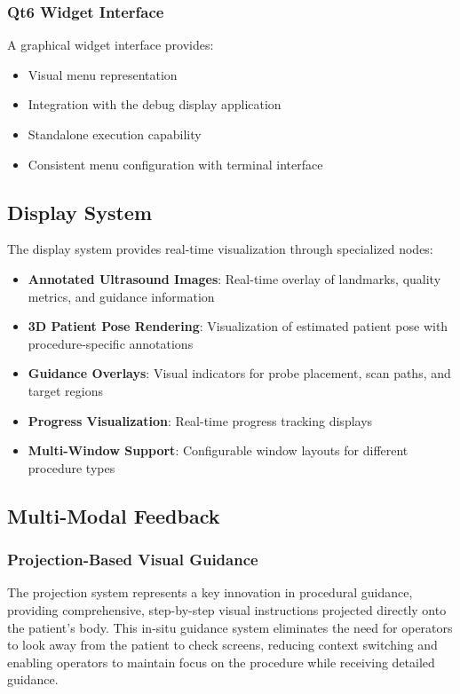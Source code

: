 \documentclass[12pt,a4paper]{article}
\begin{document}
\subsubsection{Qt6 Widget Interface}

A graphical widget interface provides:

\begin{itemize}
    \item Visual menu representation
    \item Integration with the debug display application
    \item Standalone execution capability
    \item Consistent menu configuration with terminal interface
\end{itemize}

\subsection{Display System}

The display system provides real-time visualization through specialized nodes:

\begin{itemize}
    \item \textbf{Annotated Ultrasound Images}: Real-time overlay of landmarks, quality metrics, and guidance information
    \item \textbf{3D Patient Pose Rendering}: Visualization of estimated patient pose with procedure-specific annotations
    \item \textbf{Guidance Overlays}: Visual indicators for probe placement, scan paths, and target regions
    \item \textbf{Progress Visualization}: Real-time progress tracking displays
    \item \textbf{Multi-Window Support}: Configurable window layouts for different procedure types
\end{itemize}

\subsection{Multi-Modal Feedback}

\subsubsection{Projection-Based Visual Guidance}

The projection system represents a key innovation in procedural guidance, providing comprehensive, step-by-step visual instructions projected directly onto the patient's body. This in-situ guidance system eliminates the need for operators to look away from the patient to check screens, reducing context switching and enabling operators to maintain focus on the procedure while receiving detailed guidance.
\end{document}
